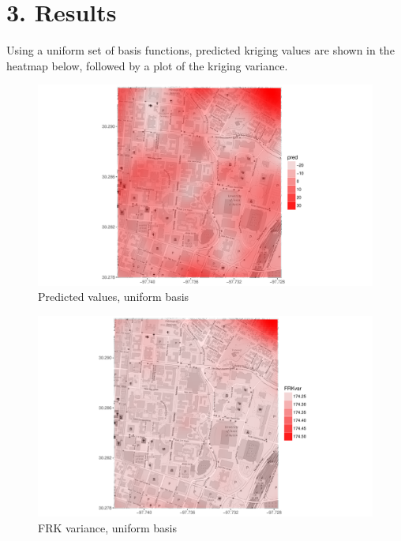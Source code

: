 \documentclass[11pt]{article}
\begin{document}
\newpage
\section{3. Results}

Using a uniform set of basis functions, predicted kriging values are shown in the heatmap below, followed by a plot of the kriging variance. \\

\begin{figure}[H]
\centering
\includegraphics[width=120mm,keepaspectratio]{Images/pred.pdf}
\caption{Predicted values, uniform basis \label{fig:4}}
\end{figure}

\begin{figure}[H]
\centering
\includegraphics[width=120mm,keepaspectratio]{Images/var.pdf}
\caption{FRK variance, uniform basis \label{fig:5}}
\end{figure}
\end{document}
